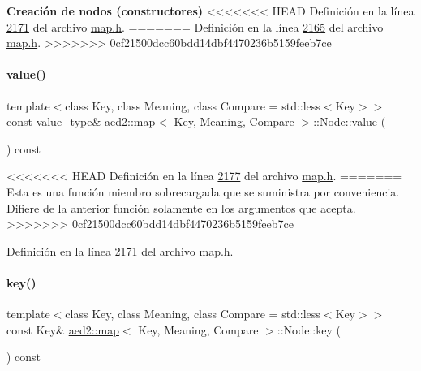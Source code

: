 \begin{Indent}{\bf \-Creación de nodos (constructores)}
<<<<<<< HEAD
\-Definición en la línea \hyperlink{map_8h_source_l02171}{2171} del archivo \hyperlink{map_8h_source}{map.\-h}.
=======
Definición en la línea \hyperlink{map_8h_source_l02165}{2165} del archivo \hyperlink{map_8h_source}{map.\+h}.
>>>>>>> 0cf21500dcc60bdd14dbf4470236b5159feeb7ce

\mbox{\label{structaed2_1_1map_1_1Node_ab66a33cedd0ba5cc20e366d4769184ae_ab66a33cedd0ba5cc20e366d4769184ae}} 
\paragraph{\texorpdfstring{value()}{value()}\hspace{0.1cm}{\footnotesize\ttfamily [2/2]}}
{\footnotesize\ttfamily template$<$class Key, class Meaning, class Compare = std\+::less$<$\+Key$>$$>$ \\
const \hyperlink{classaed2_1_1map_a719db98e0ff9a837610f76be33264680_a719db98e0ff9a837610f76be33264680}{value\+\_\+type}\& \hyperlink{classaed2_1_1map}{aed2\+::map}$<$ Key, Meaning, Compare $>$\+::Node\+::value (\begin{DoxyParamCaption}{ }\end{DoxyParamCaption}) const\hspace{0.3cm}{\ttfamily [inline]}}

<<<<<<< HEAD
\-Definición en la línea \hyperlink{map_8h_source_l02177}{2177} del archivo \hyperlink{map_8h_source}{map.\-h}.
=======
Esta es una función miembro sobrecargada que se suministra por conveniencia. Difiere de la anterior función solamente en los argumentos que acepta. 
>>>>>>> 0cf21500dcc60bdd14dbf4470236b5159feeb7ce

Definición en la línea \hyperlink{map_8h_source_l02171}{2171} del archivo \hyperlink{map_8h_source}{map.\+h}.

\mbox{\label{structaed2_1_1map_1_1Node_a08fd071b9bba8048526b8da7e8d73831_a08fd071b9bba8048526b8da7e8d73831}} 
\paragraph{\texorpdfstring{key()}{key()}}
{\footnotesize\ttfamily template$<$class Key, class Meaning, class Compare = std\+::less$<$\+Key$>$$>$ \\
const Key\& \hyperlink{classaed2_1_1map}{aed2\+::map}$<$ Key, Meaning, Compare $>$\+::Node\+::key (\begin{DoxyParamCaption}{ }\end{DoxyParamCaption}) const\hspace{0.3cm}{\ttfamily [inline]}}




\end{Indent}
